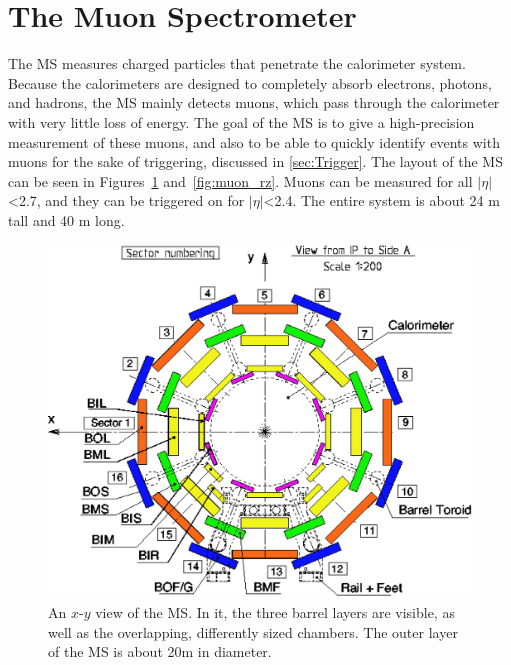 \section{The Muon Spectrometer}
\label{sec:MS}

The \acf{MS} measures charged particles that penetrate the calorimeter system. Because the calorimeters are designed to completely absorb electrons, photons, and hadrons, the \ac{MS} mainly detects muons, which pass through the calorimeter with very little loss of energy. The goal of the \ac{MS} is to give a high-precision measurement of these muons, and also to be able to quickly identify events with muons for the sake of triggering, discussed in \autoref{sec:Trigger}. The layout of the \ac{MS} can be seen in Figures~\ref{fig:muon_xy} and~\ref{fig:muon_rz}. Muons can be measured for all $|\eta|$<2.7, and they can be triggered on for $|\eta|$<2.4. The entire system is about 24 m tall and 40 m long. 

\begin{centering}
\begin{figure}[bth]
\myfloatalign
\includegraphics[width=.90\linewidth]{figures/atlas/Muon_sector_numbering.eps}
\caption{An $x$-$y$ view of the \ac{MS}. In it, the three barrel layers are visible, as well as the overlapping, differently sized chambers. The outer layer of the \ac{MS} is about 20m in diameter.}
\label{fig:muon_xy}
\end{figure}
\end{centering}

